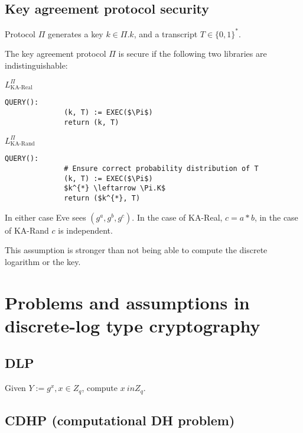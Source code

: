 \documentclass[a4paper]{scrreprt}
\begin{document}
\section{Key agreement protocol security}

Protocol $\Pi$ generates a key $k \in \Pi.k$, and a transcript $T \in \{0,
1\}^{*}$.

The key agreement protocol $\Pi$ is secure if the following two libraries are
indistinguishable:


\begin{tcbraster}[raster columns=2,raster equal height,nobeforeafter,raster column skip=2cm]
	\begin{library}{$L^\Pi_{\text{KA-Real}}$}
		\begin{lstlisting}[mathescape=true,autogobble=true]
			QUERY():
			  (k, T) := EXEC($\Pi$)
			  return (k, T)
		\end{lstlisting}
	\end{library}
	\begin{library}{$L^\Pi_{\text{KA-Rand}}$}
		\begin{lstlisting}[mathescape=true,autogobble=true]
			QUERY():
			  # Ensure correct probability distribution of T
			  (k, T) := EXEC($\Pi$)
			  $k^{*} \leftarrow \Pi.K$
			  return ($k^{*}, T)
		\end{lstlisting}
	\end{library}
\end{tcbraster}

In either case Eve sees $(g^a, g^b, g^c)$. In the case of KA-Real, $c = a*b$,
in the case of KA-Rand $c$ is independent.

This assumption is stronger than not being able to compute the discrete
logarithm or the key.

\chapter{Problems and assumptions in discrete-log type cryptography}

\section{DLP}

Given $Y := g^x, x \in Z_q$, compute $x \ in Z_q$.

\section{CDHP (computational DH problem)}
\end{document}
